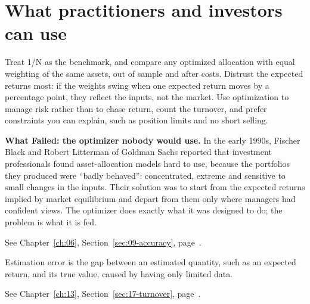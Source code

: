 \section{What practitioners and investors can use}
\label{sec:12-investors}

Treat 1/N as the benchmark, and compare any optimized allocation with equal weighting of the same assets, out of sample and after costs. Distrust the expected returns most: if the weights swing when one expected return moves by a percentage point, they reflect the inputs, not the market. Use optimization to manage risk rather than to chase return, count the turnover, and prefer constraints you can explain, such as position limits and no short selling.

\begin{callout}
\textbf{What Failed: the optimizer nobody would use.} In the early 1990s, Fischer Black and Robert Litterman of Goldman Sachs reported that investment professionals found asset-allocation models hard to use, because the portfolios they produced were ``badly behaved'': concentrated, extreme and sensitive to small changes in the inputs. Their solution was to start from the expected returns implied by market equilibrium and depart from them only where managers had confident views. The optimizer does exactly what it was designed to do; the problem is what it is fed.
\end{callout}

\makeatletter
{}
\makeatother

\begin{keyterms}
\small
\begin{description}[leftmargin=0pt, itemsep=2pt, parsep=0pt, font=\normalfont\bfseries\color{FEMaroon}]
  \item[Certainty equivalent.] See Chapter~\ref{ch:06}, Section~\ref{sec:09-accuracy}, page~\pageref{sec:09-accuracy}.
  \item[Estimation error.] Estimation error is the gap between an estimated quantity, such as an expected return, and its true value, caused by having only limited data.
  \item[Turnover.] See Chapter~\ref{ch:13}, Section~\ref{sec:17-turnover}, page~\pageref{sec:17-turnover}.
\end{description}
\end{keyterms}
